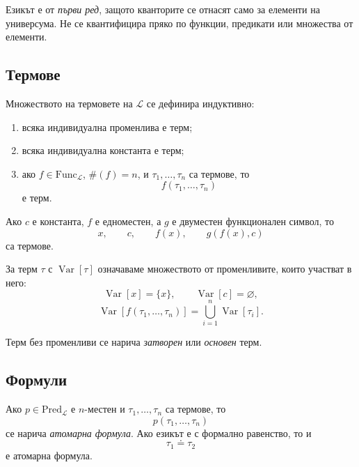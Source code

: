 \begin{remark}
Езикът е от \emph{първи ред}, защото кванторите се отнасят само за елементи на универсума. Не се квантифицира пряко по функции, предикати или множества от елементи.
\end{remark}

\subsection{Термове}\label{s:21.1.2}

\begin{defn}
Множеството на термовете на $\mathcal L$ се дефинира индуктивно:
\begin{enumerate}
\item всяка индивидуална променлива е терм;
\item всяка индивидуална константа е терм;
\item ако $f\in\mathrm{Func}_{\mathcal L}$, $\#(f)=n$, и $\tau_1,\ldots,\tau_n$ са термове, то
\[
f(\tau_1,\ldots,\tau_n)
\]
е терм.
\end{enumerate}
\end{defn}

\begin{example}
Ако $c$ е константа, $f$ е едноместен, а $g$ е двуместен функционален символ, то
\[
x,\qquad c,\qquad f(x),\qquad g(f(x),c)
\]
са термове.
\end{example}

За терм $\tau$ с $\operatorname{Var}[\tau]$ означаваме множеството от променливите, които участват в него:
\[
\operatorname{Var}[x]=\{x\},\qquad
\operatorname{Var}[c]=\varnothing,
\]
\[
\operatorname{Var}[f(\tau_1,\ldots,\tau_n)]
 =\bigcup_{i=1}^{n}\operatorname{Var}[\tau_i].
\]
\begin{defn}
Терм без променливи се нарича \emph{затворен} или \emph{основен} терм.
\end{defn}

\subsection{Формули}\label{s:21.1.3}

\begin{defn}
Ако $p\in\mathrm{Pred}_{\mathcal L}$ е $n$-местен и $\tau_1,\ldots,\tau_n$ са термове, то
\[
p(\tau_1,\ldots,\tau_n)
\]
се нарича \emph{атомарна формула}. Ако езикът е с формално равенство, то и
\[
\tau_1\doteq\tau_2
\]
е атомарна формула.
\end{defn}

